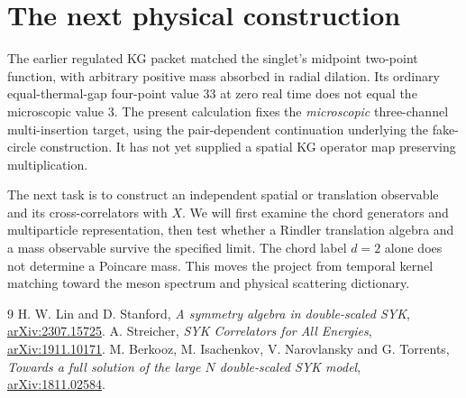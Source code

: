 \documentclass[11pt,a4paper]{article}
\begin{document}
\section{The next physical construction}
The earlier regulated KG packet matched the singlet's midpoint two-point
function, with arbitrary positive mass absorbed in radial dilation.
Its ordinary equal-thermal-gap four-point value $33$ at zero real time
does not equal the microscopic value $3$. The present calculation fixes
the \emph{microscopic} three-channel multi-insertion target, using the
pair-dependent continuation underlying the fake-circle construction.
It has not yet supplied a spatial KG operator map preserving multiplication.

The next task is to construct an independent spatial or translation
observable and its cross-correlators with $X$. We will first examine the
chord generators and multiparticle representation, then test whether a
Rindler translation algebra and a mass observable survive the specified
limit. The chord label $d=2$ alone does not determine a Poincare mass.
This moves the project from temporal kernel matching toward the meson
spectrum and physical scattering dictionary.

\begin{thebibliography}{9}
 H. W. Lin and D. Stanford, \emph{A symmetry algebra in
double-scaled SYK}, \href{https://arxiv.org/abs/2307.15725}{arXiv:2307.15725}.
 A. Streicher, \emph{SYK Correlators for All Energies},
\href{https://arxiv.org/abs/1911.10171}{arXiv:1911.10171}.
 M. Berkooz, M. Isachenkov, V. Narovlansky and G. Torrents,
\emph{Towards a full solution of the large $N$ double-scaled SYK model},
\href{https://arxiv.org/abs/1811.02584}{arXiv:1811.02584}.
\end{thebibliography}
\end{document}
